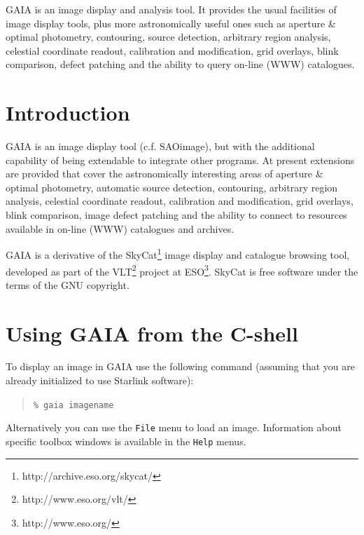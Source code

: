 \documentclass[twoside,11pt]{article}
\newcommand{\stardocinitials}  {SUN}
\newcommand{\stardocnumber}    {214.6}
\newcommand{\stardocabstract} {GAIA is an image display and analysis
tool. It provides the usual facilities of image display tools, plus
more astronomically useful ones such as aperture \& optimal photometry,
contouring, source detection, arbitrary region analysis, celestial
coordinate readout, calibration and modification, grid overlays, blink
comparison, defect patching and the ability to query on-line (WWW)
catalogues.}
\newcommand{\stardocname}{\stardocinitials /\stardocnumber}
\newcommand{\htmladdnormallinkfoot}[2]{#1\footnote{#2}}
\newenvironment{latexonly}{}{}
\newcommand{\xlabel}[1]{}
\renewcommand{\_}{\texttt{\symbol{95}}}
\newcommand{\mytt}[1]{{\tt{#1}}}
\renewcommand{\thepage}{\roman{page}}
\begin{document}
\stardocabstract
  \newpage
  \begin{latexonly}
    \setlength{\parskip}{0mm}
    \tableofcontents
    \setlength{\parskip}{\medskipamount}
    \markboth{\stardocname}{\stardocname}
  \end{latexonly}
\cleardoublepage
\renewcommand{\thepage}{\arabic{page}}
\setcounter{page}{1}


\section{Introduction\xlabel{introduction}\label{introduction}}

GAIA is an image display tool (c.f. SAOimage), but with the additional
capability of being extendable to integrate other programs.  At
present extensions are provided that cover the astronomically
interesting areas of aperture \& optimal photometry, automatic source
detection, contouring, arbitrary region analysis, celestial coordinate
readout, calibration and modification, grid overlays, blink
comparison, image defect patching and the ability to connect to
resources available in on-line (WWW) catalogues and archives.

GAIA is a derivative of the
\htmladdnormallinkfoot{SkyCat}{http://archive.eso.org/skycat/} image
display and catalogue browsing tool, developed as part of the
\htmladdnormallinkfoot{VLT}{http://www.eso.org/vlt/} project at
\htmladdnormallinkfoot{ESO}{http://www.eso.org/}. SkyCat is free software
under the terms of the GNU copyright.

\section{\xlabel{using_gaia_from_the_cshell}Using GAIA from the C-shell}

To display an image in GAIA use the following command
(assuming that you are already initialized to use Starlink software):
\begin{quote}
\mytt{\% gaia image\_name}
\end{quote}
Alternatively you can use the \mytt{File} menu to load an image.
Information about specific toolbox windows is available in the
\mytt{Help} menus.
\end{document}
